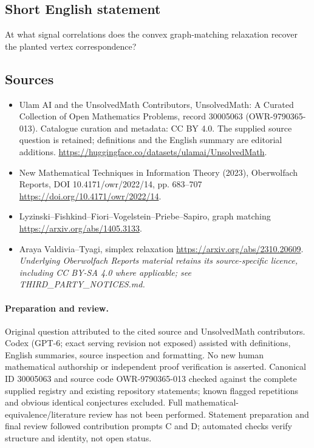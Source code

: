 \documentclass[11pt]{article}
\begin{document}
\subsection{Short English statement}
At what signal correlations does the convex graph-matching relaxation recover the planted vertex correspondence?
\subsection{Sources}
\begin{itemize}
\item[\hypertarget{source:30005063:1}{S1}] Ulam AI and the UnsolvedMath Contributors, UnsolvedMath: A Curated Collection of Open Mathematics Problems, record 30005063 (OWR-9790365-013). Catalogue curation and metadata: CC BY 4.0. The supplied source question is retained; definitions and the English summary are editorial additions.
\url{https://huggingface.co/datasets/ulamai/UnsolvedMath}.
\item[\hypertarget{source:30005063:2}{S2}] New Mathematical Techniques in Information Theory (2023), Oberwolfach Reports, DOI 10.4171/owr/2022/14, pp. 683--707
\url{https://doi.org/10.4171/owr/2022/14}.
\item[\hypertarget{source:30005063:3}{S3}] Lyzinski--Fishkind--Fiori--Vogelstein--Priebe--Sapiro, graph matching
\url{https://arxiv.org/abs/1405.3133}.
\item[\hypertarget{source:30005063:4}{S4}] Araya Valdivia--Tyagi, simplex relaxation
\url{https://arxiv.org/abs/2310.20609}.
\textit{Underlying Oberwolfach Reports material retains its source-specific licence, including CC BY-SA 4.0 where applicable; see THIRD\_PARTY\_NOTICES.md.}
\end{itemize}
\paragraph{Preparation and review.}
Original question attributed to the cited source and UnsolvedMath contributors. Codex (GPT-6; exact serving revision not exposed) assisted with definitions, English summaries, source inspection and formatting. No new human mathematical authorship or independent proof verification is asserted. Canonical ID 30005063 and source code OWR-9790365-013 checked against the complete supplied registry and existing repository statements; known flagged repetitions and obvious identical conjectures excluded. Full mathematical-equivalence/literature review has not been performed. Statement preparation and final review followed contribution prompts C and D; automated checks verify structure and identity, not open status.
\label{end:30005063}
\end{document}
